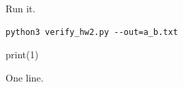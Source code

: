\documentclass{akizumi-hw}
\begin{document}
\begin{problem}
Run it.
\begin{solution}
\begin{verbatim}
python3 verify_hw2.py --out=a_b.txt
\end{verbatim}
\begin{codeblock}[lang=python]
print(1)
\end{codeblock}
\end{solution}
\begin{solution} One line. \end{solution}
\end{problem}
\end{document}
